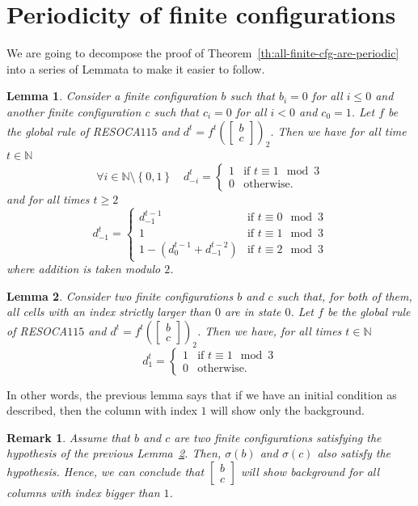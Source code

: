 \documentclass[submission,copyright,creativecommons]{eptcs}
\newcommand{\set}[1]{\ensuremath{\left\{#1\right\}}\xspace}
\newcommand{\N}{\ensuremath{\mathbb{N}}\xspace}
\newcommand{\cvres}[2]{\ensuremath{\begin{bmatrix}#1\\#2\end{bmatrix}}\xspace}
\newcommand{\RESOCA}{RESOCA\xspace}
\newtheorem{lemma}{Lemma}
\newtheorem{remark}{Remark}
\begin{document}
\section{Periodicity of finite configurations}
\label{sec:periodicity-of-finite-cfg}
%
We are going to decompose the proof of Theorem~\ref{th:all-finite-cfg-are-periodic}
into a series of Lemmata to make it easier to follow.
\begin{lemma}
\label{lem:periodicity-1}
 Consider a finite configuration $b$ such that $b_i=0$ for all $i\leq0$ and another finite configuration $c$ such that $c_i=0$ for all $i<0$ and $c_0=1$. Let $f$ be the global rule of \RESOCA $115$ and $d^t=f^t\left(\cvres{b}{c}\right)_2$. Then we have for all time $t\in\N$
 \[
 \forall i\in\N\setminus\set{0,1}\quad d^t_{-i}=
 \begin{cases}
 1&\text{if\ }t\equiv1\mod3\\
 0&\text{otherwise.}
 \end{cases}
 \]
 and for all times $t\geq2$
 \[
 d^t_{-1}= \begin{cases}
 d^{t-1}_{-1}&\text{if\ }t\equiv0\mod3\\
 1&\text{if\ }t\equiv1\mod3\\
 1-(d^{t-1}_0+d^{t-2}_{-1})&\text{if\ }t\equiv2\mod3
 \end{cases}
 \]
 where addition is taken modulo $2$.
\end{lemma}
\begin{lemma}
\label{lem:periodicity-2}
 Consider two finite configurations $b$ and $c$
 such that, for both of them, all cells with an index strictly larger than $0$ are in state $0$. Let $f$ be the global rule of \RESOCA $115$ and $d^t=f^t\left(\cvres{b}{c}\right)_2$. Then we have, for all times $t\in\N$
 \[
 d^t_1=
 \begin{cases}
 1&\text{if\ }t\equiv1\mod3\\
 0&\text{otherwise.}
 \end{cases}
 \]
\end{lemma}
In other words, the previous lemma says that if we have an initial condition as described, then the column with index $1$ will show only the background.
\begin{remark}
Assume that $b$ and $c$ are two finite configurations satisfying the hypothesis
of the previous Lemma~\ref{lem:periodicity-2}. Then, $\sigma(b)$ and $\sigma(c)$ also satisfy the hypothesis. Hence, we can conclude that \cvres{b}{c} will show background for all columns with index bigger than
$1$.
\end{remark}
\end{document}
